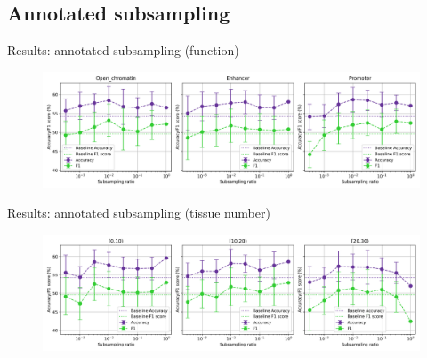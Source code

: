 \documentclass[aspectratio=169]{beamer}
\begin{document}
\subsection{Annotated subsampling}
\begin{frame}{Results: annotated subsampling (function)}
\begin{figure}[H]
    \centering
    \includegraphics[width=\textwidth]{../figures/subsample_annotated.png}
    \label{fig:res2a}
\end{figure}
\end{frame}

\begin{frame}{Results: annotated subsampling (tissue number)}
\begin{figure}[H]
    \centering
    \includegraphics[width=\textwidth]{../figures/subsample_ntissue.png}
    \label{fig:res2b}
\end{figure}
\end{frame}
\end{document}
